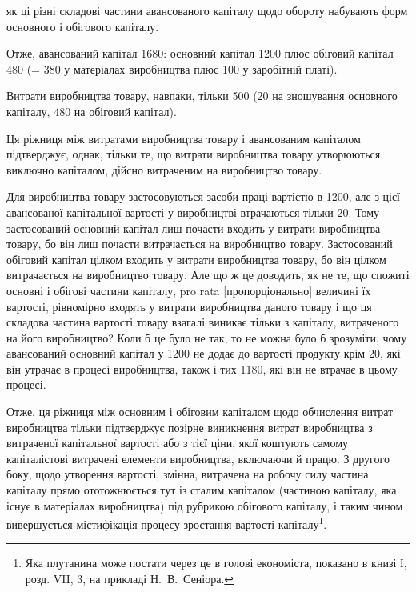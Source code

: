 \parcont{}  %
як ці різні складові частини авансованого капіталу щодо обороту
набувають форм основного і обігового капіталу.

Отже, авансований капітал \deq{} 1680: основний
капітал \deq{} 1200 плюс обіговий капітал \deq{}
480 (= 380 у матеріалах
виробництва плюс 100 у заробітній платі).

Витрати виробництва товару, навпаки, \deq{} тільки 500 (20 на зношування основного капіталу,
480 на обіговий капітал).

Ця ріжниця між витратами виробництва товару і авансованим
капіталом підтверджує, однак, тільки те, що витрати
виробництва товару утворюються виключно капіталом, дійсно
витраченим на виробництво товару.

Для виробництва товару застосовуються засоби праці вартістю
в 1200, але з цієї авансованої капітальної
вартості у виробництві втрачаються тільки 20. Тому застосований основний капітал лиш почасти
входить у витрати виробництва товару, бо він лиш почасти
витрачається на виробництво товару. Застосований обіговий
капітал цілком входить у витрати виробництва товару, бо він
цілком витрачається на виробництво товару. Але що ж це доводить,
як не те, що спожиті основні і обігові частини капіталу,
pro rata [пропорціонально] величині їх вартості, рівномірно
входять у витрати виробництва даного товару і що ця складова
частина вартості товару взагалі виникає тільки з капіталу,
витраченого на його виробництво? Коли б це було не так, то
не можна було б зрозуміти, чому авансований основний капітал
у 1200 не додає до вартості продукту крім
20, які він утрачає в процесі виробництва,
також і тих 1180, які він не втрачає в цьому
процесі.

Отже, ця ріжниця між основним і обіговим капіталом щодо
обчислення витрат виробництва тільки підтверджує позірне
виникнення витрат виробництва з витраченої капітальної вартості
або з тієї ціни, якої коштують самому капіталістові витрачені
елементи виробництва, включаючи й працю. З другого
боку, щодо утворення вартості, змінна, витрачена на робочу
силу частина капіталу прямо ототожнюється тут із сталим капіталом
(частиною капіталу, яка існує в матеріалах виробництва)
під рубрикою обігового капіталу, і таким чином вивершується
містифікація процесу зростання вартості капіталу\footnote{
Яка плутанина може постати через це в голові економіста, показано
в книзі І, розд. VII, 3, на прикладі Н.~В.~Сеніора.
}.

